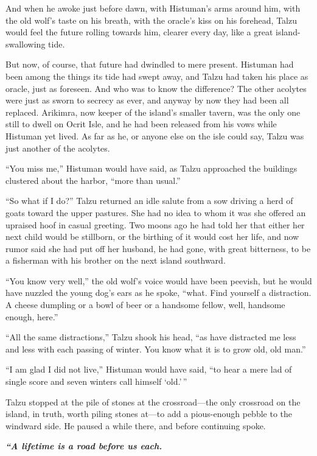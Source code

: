 And when he awoke just before dawn, with Histuman's arms around him, with the old wolf's taste on his breath, with the oracle's kiss on his forehead, Talzu would feel the future rolling towards him, clearer every day, like a great island-swallowing tide.

But now, of course, that future had dwindled to mere present. Histuman had been among the things its tide had swept away, and Talzu had taken his place as oracle, just as foreseen. And who was to know the difference? The other acolytes were just as sworn to secrecy as ever, and anyway by now they had been all replaced. Arikimra, now keeper of the island's smaller tavern, was the only one still to dwell on Ocrit Isle, and he had been released from his vows while Histuman yet lived. As far as he, or anyone else on the isle could say, Talzu was just another of the acolytes.

``You miss me,'' Histuman would have said, as Talzu approached the buildings clustered about the harbor, ``more than usual.''

``So what if I do?'' Talzu returned an idle salute from a sow driving a herd of goats toward the upper pastures. She had no idea to whom it was she offered an upraised hoof in casual greeting. Two moons ago he had told her that either her next child would be stillborn, or the birthing of it would cost her life, and now rumor said she had put off her husband, he had gone, with great bitterness, to be a fisherman with his brother on the next island southward.

``You know very well,'' the old wolf's voice would have been peevish, but he would have nuzzled the young dog's ears as he spoke, ``what. Find yourself a distraction. A cheese dumpling or a bowl of beer or a handsome fellow, well, handsome enough, here.''

``All the same distractions,'' Talzu shook his head, ``as have distracted me less and less with each passing of winter. You know what it is to grow old, old man.''

``I am glad I did not live,'' Histuman would have said, ``to hear a mere lad of single score and seven winters call himself `old.'\,''

Talzu stopped at the pile of stones at the crossroad---the only crossroad on the island, in truth, worth piling stones at---to add a pious-enough pebble to the windward side. He paused a while there, and before continuing spoke.

\emph{\textbf{``A lifetime is a road before us each.}}

